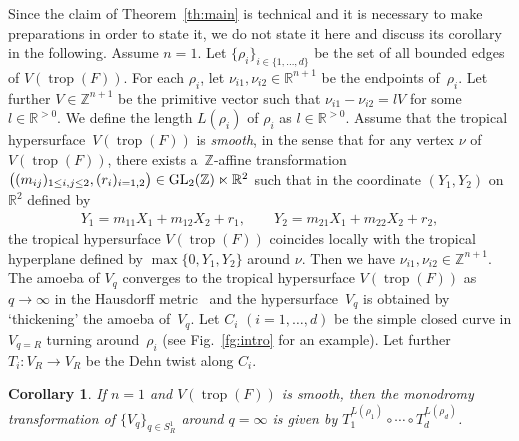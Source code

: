 \documentclass[10pt,a4paper]{amsart}
\numberwithin{equation}{section}
\newtheorem{Corollary}[Theorem]{Corollary}
\begin{document}
Since the claim of Theorem~\ref{th:main} is technical and it is necessary to make preparations in order to state it, we do not state it here and discuss its corollary in the following. Assume $n=1$. Let $\{\rho_i \}_{i \in \{1, \dots, d\}}$ be the set of all bounded edges of $V(\operatorname{trop}(F))$.
For each $\rho_i$, let $\nu_{i1}, \nu_{i2} \in {\mathbb R}^{n+1}$ be the endpoints of~$\rho_i$. Let further $V \in {\mathbb Z}^{n+1}$ be the primitive vector such that $\nu_{i1}-\nu_{i2}=lV$ for some $l \in {\mathbb R}^{>0}$. We def\/ine the length $L(\rho_i)$ of $\rho_i$ as $l \in {\mathbb R}^{>0}$. Assume that the tropical hypersur\-face~$V(\operatorname{trop}(F))$ is \textit{smooth}, in the sense that for any vertex $\nu$ of $V(\operatorname{trop}(F))$, there exists a~${\mathbb Z}$-af\/f\/ine transformation $\big((m_{ij})_{1 \leq i,j \leq 2}, (r_i)_{i=1,2} \big) \in {\rm GL}_2({\mathbb Z}) \ltimes {\mathbb R}^2$ such that in the coordinate $(Y_1, Y_2)$ on~${\mathbb R}^2$ def\/ined by
\begin{gather*}
Y_1=m_{11}X_1+m_{12}X_2+r_1, \qquad Y_2=m_{21}X_1+m_{22}X_2+r_2,
\end{gather*}
the tropical hypersurface $V(\operatorname{trop}(F))$ coincides locally with the tropical hyperplane def\/ined by $\max \{0, Y_1, Y_2 \}$ around $\nu$.
Then we have $\nu_{i1}, \nu_{i2} \in {\mathbb Z}^{n+1}$. The amoeba of $V_q$ converges to the tropical hypersurface $V(\operatorname{trop}(F))$ as $q \to \infty$ in the Hausdorf\/f metric~\cite{MR2079993, ISSN:1401-5617} and the hypersurface~$V_q$ is obtained by `thickening' the amoeba of~$V_q$. Let $C_i$ $(i=1, \dots, d)$ be the simple closed curve in $V_{q=R}$ turning around~$\rho_i$ (see Fig.~\ref{fg:intro} for an example).
Let further $T_{i} \colon V_R \to V_R$ be the Dehn twist along $C_i$.

\begin{Corollary}\label{cr:iwa} If $n=1$ and $V(\operatorname{trop}(F))$ is smooth, then the monodromy transformation of $\{V_q\}_{q \in S_R^1}$ around $q=\infty$ is given by $T_{1}^{L(\rho_1)} \circ \cdots \circ T_{d}^{L(\rho_d)}$.
\end{Corollary}
\end{document}
